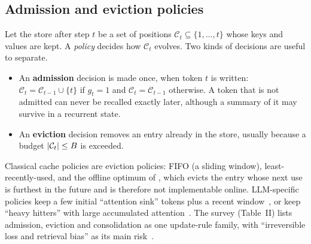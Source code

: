 \subsection{Admission and eviction policies}\label{sec:c13-policies}

Let the store after step $t$ be a set of positions $\mathcal{C}_t\subseteq\{1,\dots,t\}$ whose
keys and values are kept. A \emph{policy} decides how $\mathcal{C}_t$ evolves. Two kinds of decisions
are useful to separate.
\begin{itemize}
  \item An \textbf{admission} decision is made once, when token $t$ is written:
        $\mathcal{C}_t=\mathcal{C}_{t-1}\cup\{t\}$ if $g_t=1$ and $\mathcal{C}_t=\mathcal{C}_{t-1}$ otherwise.
        A token that is not admitted can never be recalled exactly later, although a summary
        of it may survive in a recurrent state.
  \item An \textbf{eviction} decision removes an entry already in the store, usually because a
        budget $\left\lvert \mathcal{C}_t\right\rvert\le B$ is exceeded.
\end{itemize}
Classical cache policies are eviction policies: FIFO (a sliding window), least-recently-used, and the
offline optimum of \citet{c13-belady1966}, which evicts the entry whose next use is furthest in the
future and is therefore not implementable online. LLM-specific policies keep a few initial ``attention
sink'' tokens plus a recent window~\citep{xiao2023streamingllm}, or keep ``heavy hitters'' with large
accumulated attention~\citep{c13-zhang2023h2o}. The survey (Table~II) lists admission, eviction and
consolidation as one update-rule family, with ``irreversible loss and retrieval bias'' as its main
risk~\citep{zhoubian2026memory}.

